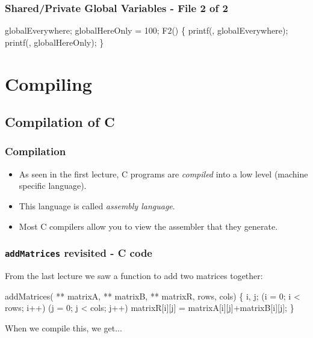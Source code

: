 \documentclass[smaller,handout,table]{beamer}
\begin{document}
\begin{frame}[fragile]
\frametitle{Shared/Private Global Variables - File 2 of 2}
\vspace{-0.1in}
\begin{semiverbatim}
\small
\kr\kl{} 
\kl
\kl{} globalEverywhere;
\kl{}
\kl
\kl{} globalHereOnly = 100;
\kl
\kl{} F2()
\kl\{
\kl   printf(,
\kl                 globalEverywhere);
\kl                 
\kl   printf(,
\kl                 globalHereOnly);
\kl\}
\end{semiverbatim}
\end{frame}

\section{Compiling}
\subsection{Compilation of C}
\begin{frame}
\frametitle{Compilation}
\begin{itemize}
\item As seen in the first lecture, C programs are \emph{compiled} into a low level (machine specific language).
\item This language is called \emph{assembly language}.
\item Most C compilers allow you to view the assembler that they generate.
\end{itemize}
\end{frame}

\begin{frame}[fragile]
\frametitle{{\tt addMatrices} revisited - C code}
From the last lecture we saw a function to add two matrices together:
\begin{semiverbatim}
\small
{} addMatrices( ** matrixA,  ** matrixB,
                  ** matrixR,
                  rows,  cols)
\{
    i, j;
    (i = 0; i < rows; i++)
       (j = 0; j < cols; j++)
         matrixR[i][j] = matrixA[i][j]+matrixB[i][j];
\}
\end{semiverbatim}
When we compile this, we get...
\end{frame}
\end{document}
